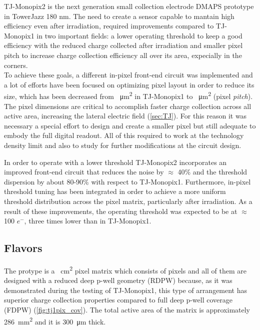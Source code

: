TJ-Monopix2 is the next generation small collection electrode DMAPS prototype in TowerJazz 180 nm. The need to create a sensor capable to mantain high efficiency even after irradiation, required improvements compared to TJ-Monopix1 in two important fields: a lower operating threshold to keep a good efficiency with the reduced charge collected after irradiation and smaller pixel pitch to increase charge collection efficiency all over its area, expecially in the corners.\\

To achieve these goals, a different in-pixel front-end circuit was implemented and a lot of efforts have been focused on optimizing pixel layout in order to reduce its size, which has been decreased from ~\unit{\micro m^{2}} in TJ-Monopix1 to ~\unit{\micro m^{2}} (pixel \textit{pitch}). The pixel dimensions are critical to accomplish faster charge collection across all active area, increasing the lateral electric field (\autoref{sec:TJ}). For this reason it was necessary a special effort to design and create a smaller pixel but still adequate to embody the full digital readout. All of this required to work at the technology density limit and also to study for further modifications at the circuit design.

In order to operate with a lower threshold TJ-Monopix2 incorporates an improved front-end circuit that reduces the noise by $\approx$ 40\% and the threshold dispersion by about 80-90\% with respect to TJ-Monopix1. Furthermore, in-pixel threshold tuning has been integrated in order to achieve a more uniform threshold distribution across the pixel matrix, particularly after irradiation. As a result of these improvements, the operating threshold was expected to be at $\approx$ 100 $e^{-}$, three times lower than in TJ-Monopix1.



\subsection{Flavors} \label{sec:flavors}

The protype is a ~\unit{cm^{2}} pixel matrix which consists of  pixels and all of them are designed with a reduced deep p-well geometry (RDPW) because, as it was demonstrated during the testing of TJ-Monopix1, this type of arrangement has superior charge collection properties compared to full deep p-well coverage (FDPW) (\autoref{fig:tj1pix_cov}). The total active area of the matrix is approximately \SI{286}{mm^{2}} and it is \SI{300}{\micro m} thick.


